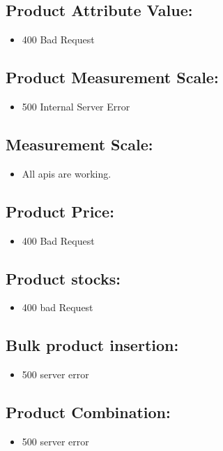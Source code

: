 \documentclass[12pt,a4paper]{article}
\begin{document}
\subsection{Product Attribute Value:}
\begin{itemize}
    \item  400 Bad Request
\end{itemize}

\subsection{Product Measurement Scale:}
\begin{itemize}
    \item 500 Internal Server Error
\end{itemize}

\subsection{Measurement Scale:}
\begin{itemize}
    \item All apis are working.
\end{itemize}

\subsection{Product Price:}
\begin{itemize}
    \item 400 Bad Request
\end{itemize}

\subsection{Product stocks:}
\begin{itemize}
    \item 400 bad Request
\end{itemize}

\subsection{Bulk product insertion:}
\begin{itemize}
    \item  500 server error
\end{itemize}

\subsection{Product Combination:}
\begin{itemize}
    \item 500 server error
\end{itemize}
\end{document}
